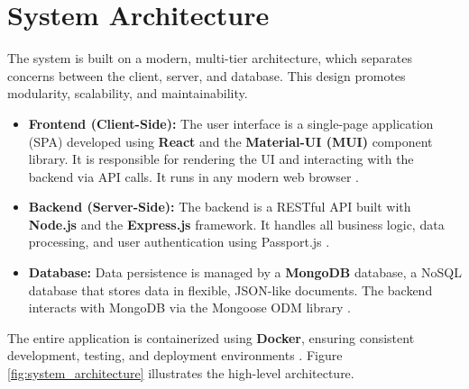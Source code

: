 \section{System Architecture}
\label{sec:system_architecture}

The system is built on a modern, multi-tier architecture, which separates concerns between the client, server, and database. This design promotes modularity, scalability, and maintainability.

\begin{itemize}
    \item \textbf{Frontend (Client-Side):} The user interface is a single-page application (SPA) developed using \textbf{React} and the \textbf{Material-UI (MUI)} component library. It is responsible for rendering the UI and interacting with the backend via API calls. It runs in any modern web browser \cite{srs}.
    \item \textbf{Backend (Server-Side):} The backend is a RESTful API built with \textbf{Node.js} and the \textbf{Express.js} framework. It handles all business logic, data processing, and user authentication using Passport.js \cite{srs}.
    \item \textbf{Database:} Data persistence is managed by a \textbf{MongoDB} database, a NoSQL database that stores data in flexible, JSON-like documents. The backend interacts with MongoDB via the Mongoose ODM library \cite{srs}.
\end{itemize}

The entire application is containerized using \textbf{Docker}, ensuring consistent development, testing, and deployment environments \cite{srs}. Figure \ref{fig:system_architecture} illustrates the high-level architecture.

